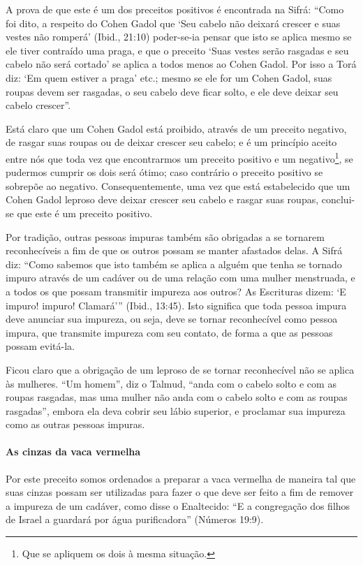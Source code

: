 A prova de que este é um dos preceitos positivos é encontrada na Sifrá:
``Como foi dito, a respeito do Cohen Gadol que `Seu cabelo não deixará
crescer e suas vestes não romperá' (Ibid., 21:10) poder-se-ia pensar que
isto se aplica mesmo se ele tiver contraído uma praga, e que o preceito
`Suas vestes serão rasgadas e seu cabelo não será cortado' se aplica a
todos menos ao Cohen Gadol. Por isso a Torá diz: `Em quem estiver a
praga' etc.; mesmo se ele for um Cohen Gadol, suas roupas devem ser
rasgadas, o seu cabelo deve ficar solto, e ele deve deixar seu cabelo
crescer''.

Está claro que um Cohen Gadol está proibido, através de um preceito negativo, de rasgar suas roupas ou de deixar crescer seu cabelo; e
é um princípio aceito entre nós que toda vez que encontrarmos um
preceito positivo e um negativo\footnote{Que se apliquem os dois à mesma situação.}, se pudermos
cumprir os dois será ótimo; caso contrário o preceito positivo se
sobrepõe ao negativo. Consequentemente, uma vez que está estabelecido
que um Cohen Gadol leproso deve deixar crescer seu cabelo e rasgar
suas roupas, conclui-se que este é um preceito positivo.

Por tradição, outras pessoas impuras também são obrigadas a se tornarem
reconhecíveis a fim de que os outros possam se manter afastados delas. A
Sifrá diz: ``Como sabemos que isto também se aplica a alguém que tenha
se tornado impuro através de um cadáver ou de uma relação com uma
mulher menstruada, e a todos os que possam transmitir impureza aos
outros? As Escrituras dizem: `E impuro! impuro! Clamará''' (Ibid.,
13:45). Isto significa que toda pessoa impura deve anunciar sua
impureza, ou seja, deve se tornar reconhecível como pessoa impura, que
transmite impureza com seu contato, de forma a que as pessoas possam
evitá-la.

Ficou claro que a obrigação de um leproso de se tornar reconhecível não
se aplica às mulheres. ``Um homem'', diz o Talmud, ``anda com o cabelo
solto e com as roupas rasgadas, mas uma mulher não anda com o cabelo
solto e com as roupas rasgadas'', embora ela deva cobrir seu lábio
superior, e proclamar sua impureza como as outras pessoas impuras.

\paragraph{As cinzas da vaca vermelha}

Por este preceito somos ordenados a preparar a vaca vermelha de maneira
tal que suas cinzas possam ser utilizadas para fazer o que deve ser
feito a fim de remover a impureza de um cadáver, como disse o
Enaltecido: ``E a congregação dos filhos de Israel a guardará por água
purificadora'' (Números 19:9).

